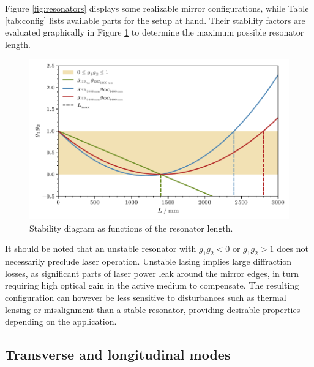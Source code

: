 Figure \ref{fig:resonators} displays some realizable mirror configurations, while Table \ref{tab:config} lists available parts for the
setup at hand. Their stability factors are evaluated graphically in Figure \ref{fig:stability} to determine the maximum possible resonator
length.

\begin{figure}[H]
	\centering
	\includegraphics{build/stability.pdf}
	\caption{Stability diagram as functions of the resonator length.}
	\label{fig:stability}
\end{figure}

It should be noted that an unstable resonator with $g_1 g_2 < 0$ or $g_1 g_2 > 1$ does not necessarily preclude laser operation. Unstable
lasing implies large diffraction losses, as significant parts of laser power leak around the mirror edges, in turn requiring high optical
gain in the active medium to compensate. The resulting configuration can however be less sensitive to disturbances such as thermal lensing
or misalignment than a stable resonator, providing desirable properties depending on the application.



\subsection{Transverse and longitudinal modes}

